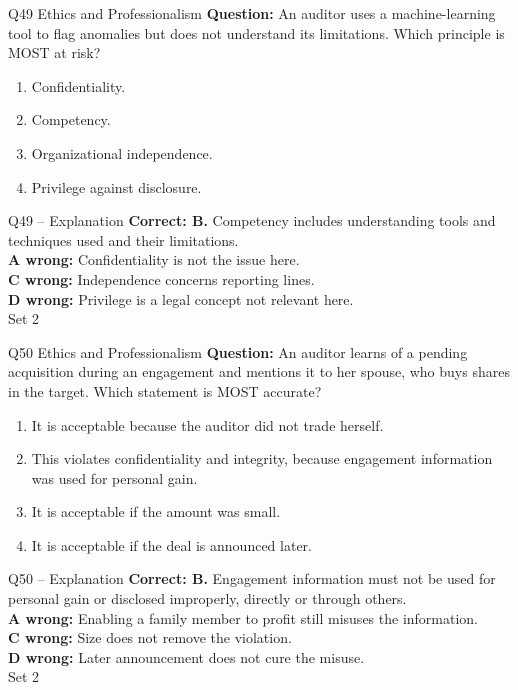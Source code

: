 \documentclass[aspectratio=169,10pt]{beamer}
\begin{document}
\begin{frame}[t]{Q49 \hfill {\scriptsize Ethics and Professionalism}}
	\small
	\textbf{Question:} An auditor uses a machine-learning tool to flag anomalies but does not understand its limitations. Which principle is MOST at risk?
	\begin{enumerate}[label=\Alph*.,itemsep=1pt,topsep=3pt]
			\item Confidentiality.
			\item Competency.
			\item Organizational independence.
			\item Privilege against disclosure.
	\end{enumerate}
\end{frame}

\begin{frame}[t]{Q49 -- Explanation}
	\footnotesize
	\textbf{Correct: B.} Competency includes understanding tools and techniques used and their limitations. \\[5pt]
\textbf{A wrong:} Confidentiality is not the issue here. \\[3pt]
\textbf{C wrong:} Independence concerns reporting lines. \\[3pt]
\textbf{D wrong:} Privilege is a legal concept not relevant here. \\[3pt]
	\vfill {\tiny Set 2}
\end{frame}

\begin{frame}[t]{Q50 \hfill {\scriptsize Ethics and Professionalism}}
	\small
	\textbf{Question:} An auditor learns of a pending acquisition during an engagement and mentions it to her spouse, who buys shares in the target. Which statement is MOST accurate?
	\begin{enumerate}[label=\Alph*.,itemsep=1pt,topsep=3pt]
			\item It is acceptable because the auditor did not trade herself.
			\item This violates confidentiality and integrity, because engagement information was used for personal gain.
			\item It is acceptable if the amount was small.
			\item It is acceptable if the deal is announced later.
	\end{enumerate}
\end{frame}

\begin{frame}[t]{Q50 -- Explanation}
	\footnotesize
	\textbf{Correct: B.} Engagement information must not be used for personal gain or disclosed improperly, directly or through others. \\[5pt]
\textbf{A wrong:} Enabling a family member to profit still misuses the information. \\[3pt]
\textbf{C wrong:} Size does not remove the violation. \\[3pt]
\textbf{D wrong:} Later announcement does not cure the misuse. \\[3pt]
	\vfill {\tiny Set 2}
\end{frame}
\end{document}
